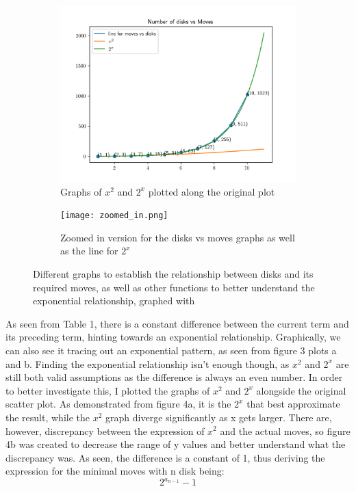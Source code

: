 \documentclass[12pt,a4paper]{article}
\begin{document}
	\begin{figure}[h!]
		\begin{subfigure}{.55\textwidth}
			\includegraphics[width=\linewidth]{comparision.png}
			\caption{Graphs of $x^2$ and $2^x$ plotted along the original plot}
			\label{fig:fig3}
		\end{subfigure}
	\begin{subfigure}{.55\textwidth}
		\texttt{[image: zoomed\_in.png]}
		\caption{Zoomed in version for the disks vs moves graphs as well as the line for $2^x$}
		\label{fig:fig4}
	\end{subfigure}
	\caption{Different graphs to establish the relationship between disks and its required moves, as well as other functions to better understand the exponential relationship, graphed with \cite{matplotlib}}
	\label{fig:fig}
	\end{figure}
	As seen from Table 1, there is a constant difference between the current term and its preceding term, hinting towards an exponential relationship. Graphically, we can also see it tracing out an exponential pattern, as seen from figure 3 plots a and b. \newline
	Finding the exponential relationship isn't enough though, as $x^2$ and $2^x$ are still both valid assumptions as the difference is always an even number. In order to better investigate this, I plotted the graphs of $x^2$ and $2^x$ alongside the original scatter plot. As demonstrated from figure 4a, it is the $2^x$ that best approximate the result, while the $x^2$ graph diverge significantly as x gets larger. There are, however, discrepancy between the expression of $x^2$ and the actual moves, so figure 4b was created to decrease the range of y values and better understand what the discrepancy was. As seen, the difference is a constant of 1, thus deriving the expression for the minimal moves with n disk being:
	\begin{equation}
		2^{a_{n-1}}-1
	\end{equation}
\end{document}
